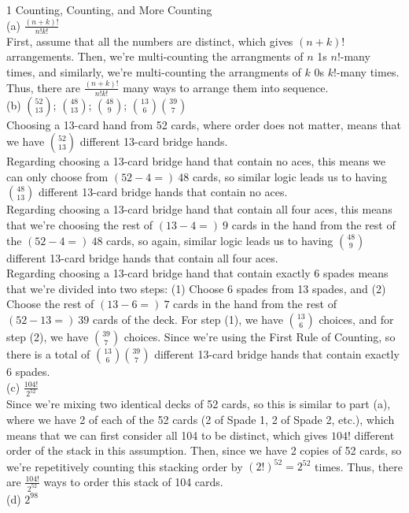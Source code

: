 \documentclass{article}
\begin{document}
{\Large 1 Counting, Counting, and More Counting} \\[.5cm]
{\color{red} (a) $\frac{(n+k)!}{n!k!}$} \\

First, assume that all the numbers are distinct, which gives $(n+k)!$ arrangements. Then, we're multi-counting the arrangments of $n$ 1s $n!$-many times, and similarly, we're multi-counting the arrangments of $k$ 0s $k!$-many times. Thus, there are $\frac{(n+k)!}{n!k!}$ many ways to arrange them into sequence. \\[.5cm]
{\color{red} (b) $\binom{52}{13}$; $\binom{48}{13}$; $\binom{48}{9}$; $\binom{13}{6}\binom{39}{7}$} \\

Choosing a 13-card hand from 52 cards, where order does not matter, means that we have $\binom{52}{13}$ different 13-card bridge hands. \\

Regarding choosing a 13-card bridge hand that contain no aces, this means we can only choose from $(52 - 4 =)\ 48$ cards, so similar logic leads us to having $\binom{48}{13}$ different 13-card bridge hands that contain no aces. \\

Regarding choosing a 13-card bridge hand that contain all four aces, this means that we're choosing the rest of $(13-4 = )\ 9$ cards in the hand from the rest of the $(52 - 4 = )\ 48$ cards, so again, similar logic leads us to having $\binom{48}{9}$ different 13-card bridge hands that contain all four aces. \\

Regarding choosing a 13-card bridge hand that contain exactly 6 spades means that we're divided into two steps: (1) Choose 6 spades from 13 spades, and (2) Choose the rest of $(13-6 =)\ 7$ cards in the hand from the rest of $(52-13 =)\ 39$ cards of the deck. For step (1), we have $\binom{13}{6}$ choices, and for step (2), we have $\binom{39}{7}$ choices. Since we're using the First Rule of Counting, so there is a total of $\binom{13}{6}\binom{39}{7}$ different 13-card bridge hands that contain exactly 6 spades. \\[.5cm]
{\color{red} (c) $\frac{104!}{2^{52}}$} \\

Since we're mixing two identical decks of 52 cards, so this is similar to part (a), where we have 2 of each of the 52 cards (2 of Spade 1, 2 of Spade 2, etc.), which means that we can first consider all 104 to be distinct, which gives $104!$ different order of the stack in this assumption. Then, since we have 2 copies of 52 cards, so we're repetitively counting this stacking order by $(2!)^{52} = 2^{52}$ times. Thus, there are $\frac{104!}{2^{52}}$ ways to order this stack of 104 cards. \\[.5cm]
{\color{red} (d) $2^{98}$} \\
\end{document}
